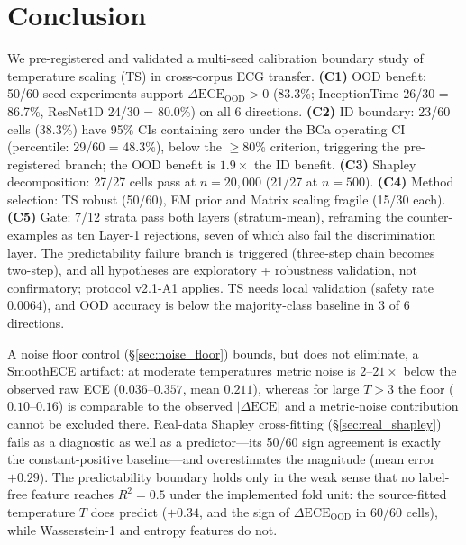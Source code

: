 \documentclass[review,12pt,nonatbib]{elsarticle}
\begin{document}
\section{Conclusion}
\label{sec:conclusion}
We pre-registered and validated a multi-seed calibration boundary study
of temperature scaling (TS) in cross-corpus ECG transfer. \textbf{(C1)}
OOD benefit: 50/60 seed experiments support
$\Delta\text{ECE}_{\text{OOD}}>0$ (83.3\%; InceptionTime 26/30 = 86.7\%,
ResNet1D 24/30 = 80.0\%) on all 6 directions. \textbf{(C2)} ID boundary:
23/60 cells (38.3\%) have 95\% CIs containing zero under the BCa
operating CI (percentile: 29/60 = 48.3\%), below the $\geq$80\%
criterion, triggering the pre-registered branch; the OOD benefit is
$1.9\times$ the ID benefit. \textbf{(C3)} Shapley decomposition: 27/27
cells pass at $n=20{,}000$ (21/27 at $n=500$). \textbf{(C4)} Method
selection: TS robust (50/60), EM prior and Matrix scaling fragile (15/30
each). \textbf{(C5)} Gate: 7/12 strata pass both layers (stratum-mean),
reframing the counter-examples as ten Layer-1 rejections, seven of which
also fail the discrimination layer. The
predictability failure branch is triggered (three-step chain becomes
two-step), and all hypotheses are exploratory + robustness validation,
not confirmatory; protocol v2.1-A1 applies. TS needs local
validation (safety rate $0.0064$), and OOD accuracy is below the
majority-class baseline in 3 of 6 directions.

A noise floor control
(\S\ref{sec:noise_floor}) bounds, but does not eliminate, a SmoothECE
artifact: at moderate temperatures metric noise is $2$--$21\times$ below
the observed raw ECE ($0.036$--$0.357$, mean $0.211$), whereas for large
$T>3$ the floor ($0.10$--$0.16$) is comparable to the observed
$|\Delta\text{ECE}|$ and a metric-noise contribution cannot be excluded
there. Real-data Shapley cross-fitting
(\S\ref{sec:real_shapley}) fails as a diagnostic as well as a
predictor---its 50/60 sign agreement is exactly the constant-positive
baseline---and overestimates the magnitude (mean error $+0.29$). The predictability boundary holds
only in the weak sense that no label-free feature reaches $R^2=0.5$
under the implemented fold unit: the source-fitted temperature $T$ does
predict ($+0.34$, and the sign of $\Delta\text{ECE}_{\text{OOD}}$ in
60/60 cells), while Wasserstein-1 and entropy features do not.
\end{document}
